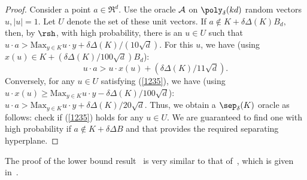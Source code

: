 \sepopt*
\begin{proof}
Consider a point $a \in \Re^d$. 
Use the  oracle $\cal A$ on $\poly_\delta(kd)$ random vectors $u, |u|=1$. Let $U$ denote the set of these unit vectors. If $a\notin K+\delta\Delta(K) B_d,$ then, by $\rsh$, with high probability, there is an $u \in U$ such that $u\cdot a> \mbox{Max}_{y\in K}u\cdot y+\delta\Delta(K)/(10\sqrt d)$. For this $u$, we have (using 
$x(u)\in K+(\delta\Delta(K)/100\sqrt d)B_d$):
\begin{equation}\label{1235}
u\cdot a>u\cdot x(u) +(\delta \Delta(K)/11\sqrt d). \end{equation}
Conversely, for any $u \in U$ satisfying (\ref{1235}),
we have (using $u\cdot x(u)\geq \mbox{Max}_{y\in K}u\cdot y-\delta\Delta(K) /100\sqrt d$):
$u\cdot a> \mbox{Max}_{y\in K}u\cdot y +
\delta\Delta(K) /20\sqrt d$.
Thus, we obtain a $\sep_\delta(K)$ oracle as follows: check if (\ref{1235}) holds for any $u \in U$. We are guaranteed to find one with high probability if $a\notin K+\delta\Delta B$ and that provides the required separating hyperplane.
\end{proof}

The proof of the lower bound result~ is very similar to that of~, which is given in~. 




